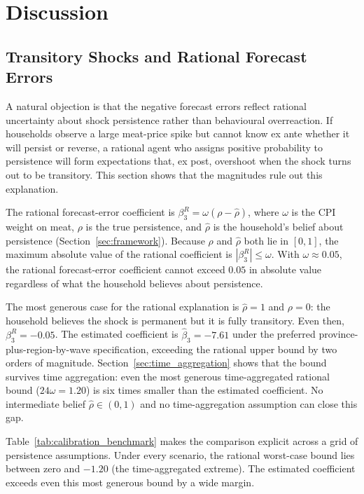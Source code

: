 
\section{Discussion}\label{sec:discussion}

\subsection{Transitory Shocks and Rational Forecast Errors}%
\label{sec:transitory}

A natural objection is that the negative forecast errors
reflect rational uncertainty about shock persistence rather
than behavioural overreaction.
If households observe a large meat-price spike but cannot know
ex ante whether it will persist or reverse, a rational agent
who assigns positive probability to persistence will form
expectations that, ex post, overshoot when the shock turns out
to be transitory.
This section shows that the magnitudes rule out this
explanation.

The rational forecast-error coefficient is
$\beta_3^R = \omega(\rho - \hat{\rho})$, where $\omega$ is
the CPI weight on meat, $\rho$ is the true persistence, and
$\hat{\rho}$ is the household's belief about persistence
(Section~\ref{sec:framework}).
Because $\rho$ and $\hat{\rho}$ both lie in $[0,1]$, the
maximum absolute value of the rational coefficient is
$|\beta_3^R| \leq \omega$.
With $\omega \approx 0.05$, the rational forecast-error
coefficient cannot exceed $0.05$ in absolute value regardless
of what the household believes about persistence.

The most generous case for the rational explanation is
$\hat{\rho} = 1$ and $\rho = 0$: the household believes the
shock is permanent but it is fully transitory.
Even then, $\beta_3^R = -0.05$.
The estimated coefficient is $\hat{\beta}_3 = -7.61$ under
the preferred province-plus-region-by-wave specification,
exceeding the rational upper bound by two orders of magnitude.
Section~\ref{sec:time_aggregation} shows that the bound
survives time aggregation: even the most generous
time-aggregated rational bound ($24\omega = 1.20$) is six
times smaller than the estimated coefficient.
No intermediate belief $\hat{\rho} \in (0,1)$ and no
time-aggregation assumption can close this gap.

Table~\ref{tab:calibration_benchmark} makes the comparison
explicit across a grid of persistence assumptions.
Under every scenario, the rational worst-case bound lies
between zero and $-1.20$ (the time-aggregated extreme).
The estimated coefficient exceeds even this most generous
bound by a wide margin.

